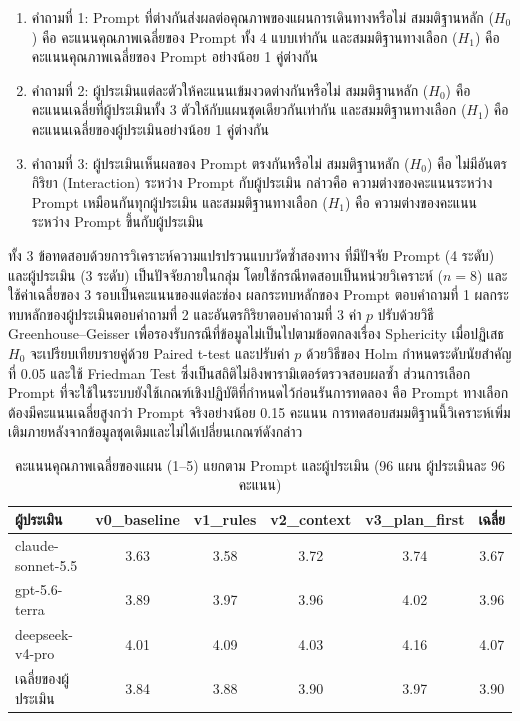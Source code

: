 \begin{enumerate}
\item คำถามที่ 1: Prompt ที่ต่างกันส่งผลต่อคุณภาพของแผนการเดินทางหรือไม่ สมมติฐานหลัก ($H_0$) คือ คะแนนคุณภาพเฉลี่ยของ Prompt ทั้ง 4 แบบเท่ากัน และสมมติฐานทางเลือก ($H_1$) คือ คะแนนคุณภาพเฉลี่ยของ Prompt อย่างน้อย 1 คู่ต่างกัน
\item คำถามที่ 2: ผู้ประเมินแต่ละตัวให้คะแนนเข้มงวดต่างกันหรือไม่ สมมติฐานหลัก ($H_0$) คือ คะแนนเฉลี่ยที่ผู้ประเมินทั้ง 3 ตัวให้กับแผนชุดเดียวกันเท่ากัน และสมมติฐานทางเลือก ($H_1$) คือ คะแนนเฉลี่ยของผู้ประเมินอย่างน้อย 1 คู่ต่างกัน
\item คำถามที่ 3: ผู้ประเมินเห็นผลของ Prompt ตรงกันหรือไม่ สมมติฐานหลัก ($H_0$) คือ ไม่มีอันตรกิริยา (Interaction) ระหว่าง Prompt กับผู้ประเมิน กล่าวคือ ความต่างของคะแนนระหว่าง Prompt เหมือนกันทุกผู้ประเมิน และสมมติฐานทางเลือก ($H_1$) คือ ความต่างของคะแนนระหว่าง Prompt ขึ้นกับผู้ประเมิน
\end{enumerate}

ทั้ง 3 ข้อทดสอบด้วยการวิเคราะห์ความแปรปรวนแบบวัดซ้ำสองทาง ที่มีปัจจัย Prompt (4 ระดับ) และผู้ประเมิน (3 ระดับ) เป็นปัจจัยภายในกลุ่ม โดยใช้กรณีทดสอบเป็นหน่วยวิเคราะห์ ($n = 8$) และใช้ค่าเฉลี่ยของ 3 รอบเป็นคะแนนของแต่ละช่อง ผลกระทบหลักของ Prompt ตอบคำถามที่ 1 ผลกระทบหลักของผู้ประเมินตอบคำถามที่ 2 และอันตรกิริยาตอบคำถามที่ 3 ค่า $p$ ปรับด้วยวิธี Greenhouse--Geisser \parencite{greenhouse1959} เพื่อรองรับกรณีที่ข้อมูลไม่เป็นไปตามข้อตกลงเรื่อง Sphericity เมื่อปฏิเสธ $H_0$ จะเปรียบเทียบรายคู่ด้วย Paired t-test และปรับค่า $p$ ด้วยวิธีของ Holm \parencite{holm1979} กำหนดระดับนัยสำคัญที่ 0.05 และใช้ Friedman Test ซึ่งเป็นสถิติไม่อิงพารามิเตอร์ตรวจสอบผลซ้ำ ส่วนการเลือก Prompt ที่จะใช้ในระบบยังใช้เกณฑ์เชิงปฏิบัติที่กำหนดไว้ก่อนรันการทดลอง คือ Prompt ทางเลือกต้องมีคะแนนเฉลี่ยสูงกว่า Prompt จริงอย่างน้อย 0.15 คะแนน การทดสอบสมมติฐานนี้วิเคราะห์เพิ่มเติมภายหลังจากข้อมูลชุดเดิมและไม่ได้เปลี่ยนเกณฑ์ดังกล่าว

\begin{table}[H]
\centering
\caption{คะแนนคุณภาพเฉลี่ยของแผน (1--5) แยกตาม Prompt และผู้ประเมิน (96 แผน ผู้ประเมินละ 96 คะแนน)}
\label{tab:prompt_eval}
\begin{tabular}{|p{3.4cm}|c|c|c|c|c|}
\hline
\textbf{ผู้ประเมิน} & \textbf{v0\_baseline} & \textbf{v1\_rules} & \textbf{v2\_context} & \textbf{v3\_plan\_first} & \textbf{เฉลี่ย} \\
\hline
claude-sonnet-5.5 & 3.63 & 3.58 & 3.72 & 3.74 & 3.67 \\ \hline
gpt-5.6-terra & 3.89 & 3.97 & 3.96 & 4.02 & 3.96 \\ \hline
deepseek-v4-pro & 4.01 & 4.09 & 4.03 & 4.16 & 4.07 \\ \hline
เฉลี่ยของผู้ประเมิน & 3.84 & 3.88 & 3.90 & 3.97 & 3.90 \\
\hline
\end{tabular}
\end{table}

